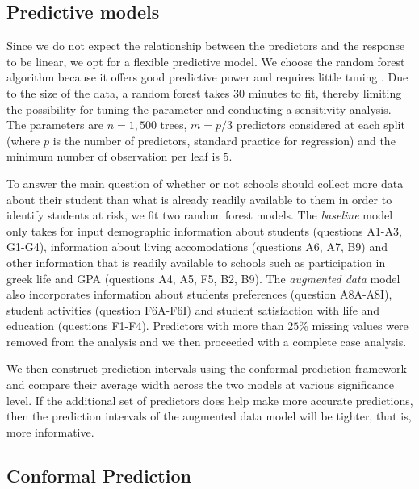 \documentclass[10pt]{amsart}%
\begin{document}
\subsection{Predictive models}
\label{sec:mod}

Since we do not expect the relationship between the predictors and the response to be linear, we opt for a flexible predictive model. We choose the random forest algorithm because it offers good predictive power and requires little tuning . Due to the size of the data, a random forest takes $30$ minutes to fit, thereby limiting the possibility for tuning the parameter and conducting a sensitivity analysis. The parameters are $n=1,500$ trees, $m=p/3$ predictors considered at each split (where $p$ is the number of predictors, standard practice for regression) and the minimum number of observation per leaf is $5$.

To answer the main question of whether or not schools should collect more data about their student than what is already readily available to them in order to identify students at risk, we fit two random forest models. The \textit{baseline} model only takes for input demographic information about students (questions A1-A3, G1-G4), information about living accomodations (questions A6, A7, B9) and other information that is readily available to schools such as participation in greek life and GPA (questions A4, A5, F5, B2, B9). The \textit{augmented data} model also incorporates information about students preferences (question A8A-A8I), student activities (question F6A-F6I) and student satisfaction with life and education (questions F1-F4). Predictors with more than $25\%$ missing values were removed from the analysis and we then proceeded with a complete case analysis.

We then construct prediction intervals using the conformal prediction framework and compare their average width across the two models at various significance level. If the additional set of predictors does help make more accurate predictions, then the prediction intervals of the augmented data model will be tighter, that is, more informative.

\subsection{Conformal Prediction}
\label{sec:conf}
\end{document}
